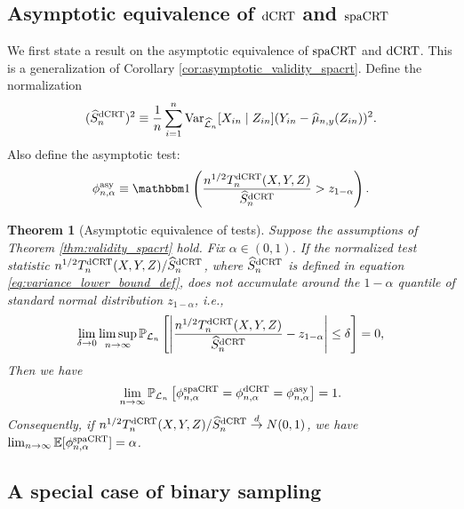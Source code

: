 \documentclass[12pt]{article}
\newtheorem{theorem}{Theorem}
\theoremstyle{definition}
\def\P{\mathbb{P}}
\def\P{\mathbb{P}}
\newcommand{\E}{\mathbb E}								%
\newcommand{\V}{\mathrm{Var}}							%
\renewcommand{\P}{\mathbb{P}}							%
\newcommand{\indicator}{\mathbbm 1}						%
\newcommand{\convd}{\overset d \rightarrow}             %
\newcommand{\srx}{X}									%
\newcommand{\srz}{Z}									%
\newcommand{\sry}{Y}									%
\newcommand{\law}{\mathcal L}							%
\newcommand{\lawhat}{\widehat{\mathcal L}}				%
\newcommand{\dCRT}{\textnormal{dCRT}} 					%
\newcommand{\spacrt}{\textnormal{spaCRT}}               %
\newcommand{\asy}{\textnormal{asy}}              %
\begin{document}
\subsection{Asymptotic equivalence of $\dCRT$ and $\spacrt$}\label{sec:asymptotic_equivalence}

We first state a result on the asymptotic equivalence of $\spacrt$ and $\dCRT$. This is a generalization of Corollary \ref{cor:asymptotic_validity_spacrt}. Define the normalization 
\begin{align}\label{eq:variance_lower_bound_def}
	(\widehat{S}_n^{\dCRT})^2\equiv\frac{1}{n}\sum_{i=1}^n\V_{\lawhat_n}[\srx_{in}\mid \srz_{in}](\sry_{in}-\widehat{\mu}_{n,y}(\srz_{in}))^2.
\end{align}
Also define the asymptotic test:
\begin{align}\label{eq:asy_test}
  \phi_{n,\alpha}^{\asy}\equiv \indicator\left(\frac{n^{1/2}T_n^{\dCRT}(\srx,\sry,\srz)}{\widehat{S}_n^{\dCRT}}>z_{1-\alpha}\right).
\end{align}

\begin{theorem}[Asymptotic equivalence of tests]\label{thm:asymptotic_equivalence}
	Suppose the assumptions of Theorem \ref{thm:validity_spacrt} hold. Fix $\alpha\in (0,1)$. If the normalized test statistic $n^{1/2}T_n^{\dCRT}(\srx,\sry,\srz)/\widehat{S}_n^{\dCRT}$, where $\widehat{S}_n^{\dCRT}$ is defined in equation \eqref{eq:variance_lower_bound_def}, does not accumulate around the $1-\alpha$ quantile of standard normal distribution $z_{1-\alpha}$, i.e.,
	\begin{align}\label{eq:nonaccumulant_condition}
	  \lim_{\delta\rightarrow0}\limsup_{n\rightarrow\infty}\P_{\law_n}\left[\left|\frac{n^{1/2}T_n^{\dCRT}(\srx,\sry,\srz)}{\widehat{S}_n^{\dCRT}}-z_{1-\alpha}\right|\leq \delta\right]=0,
	\end{align} 
	Then we have
	\begin{align*}
		\lim_{n\rightarrow\infty}\P_{\law_n}\left[\phi_{n,\alpha}^{\spacrt}=\phi_{n,\alpha}^{\dCRT}=\phi_{n,\alpha}^{\asy}\right]=1.
	\end{align*}
	Consequently, if $n^{1/2}T_n^{\dCRT}(\srx,\sry,\srz)/\widehat{S}_n^{\dCRT}\convd N(0,1)$, we have $ \lim_{n\rightarrow\infty}\E[\phi_{n,\alpha}^{\spacrt}]=\alpha$.
\end{theorem}


\subsection{A special case of binary sampling}
\end{document}
